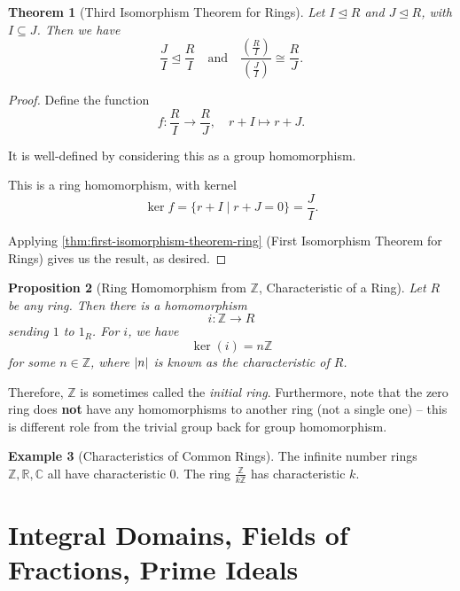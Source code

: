 \documentclass{article}
\newtheorem{theorem}{Theorem}[section]
\newtheorem{proposition}[theorem]{Proposition}
\theoremstyle{definition}
\newtheorem{example}[theorem]{Example}
\theoremstyle{remark}
\DeclarePairedDelimiter{\abs}{\lvert}{\rvert}
\newcommand{\pqty}[1]{\left(#1\right)}
\newcommand{\set}[2]{\{#1\mid #2\}}
\newcommand{\flatfrac}[2]{\frac{#1}{#2}}
\newcommand{\functiondomain}[3]{#1:#2\to #3}
\newcommand{\function}[5]{#1:#2\to #3,\quad #4\mapsto #5}
\newcommand{\qand}{\quad\text{and}\quad}
\newcommand{\isomorphic}{\cong}
\newcommand{\idealsub}{\trianglelefteq}
\newcommand{\ZZ}{\mathbb{Z}}
\newcommand{\RR}{\mathbb{R}}
\newcommand{\CC}{\mathbb{C}}
\begin{document}
\begin{theorem}[Third Isomorphism Theorem for Rings]
    \label{thm:third-isomorphism-theorem-ring}%
    Let \(I \idealsub R\) and \(J \idealsub R\), with \(I \subseteq J\). Then we have
    \[
        \flatfrac{J}{I} \idealsub \flatfrac{R}{I} \qand \flatfrac{\pqty{\flatfrac{R}{I}}}{\pqty{\flatfrac{J}{I}}} \isomorphic \flatfrac{R}{J}.
    \]
\end{theorem}

\begin{proof}
    Define the function
    \[
        \function{f}{\flatfrac{R}{I}}{\flatfrac{R}{J}}{r + I}{r + J.}
    \]

    It is well-defined by considering this as a group homomorphism.

    This is a ring homomorphism, with kernel
    \[
        \ker f = \set{r + I}{r + J = 0} = \flatfrac{J}{I}.
    \]

    Applying \autoref{thm:first-isomorphism-theorem-ring} (First Isomorphism Theorem for Rings) gives us the result, as desired.
\end{proof}

\begin{proposition}[Ring Homomorphism from \(\ZZ\), Characteristic of a Ring]
    \label{prop:ring-homomorphism-z-characteristic-of-ring}%
    Let \(R\) be any ring. Then there is a homomorphism
    \[
        \functiondomain{i}{\ZZ}{R}
    \]
    sending \(1\) to \(1_R\). For \(i\), we have
    \[
        \ker\pqty{i} = n \ZZ
    \]
    for some \(n \in \ZZ\), where \(\abs{n}\) is known as the \emph{characteristic} of \(R\).
\end{proposition}

Therefore, \(\ZZ\) is sometimes called the \emph{initial ring}. Furthermore, note that the zero ring does \textbf{not} have any homomorphisms to another ring (not a single one) -- this is different role from the trivial group back for group homomorphism.

\begin{example}[Characteristics of Common Rings]
    The infinite number rings \(\ZZ, \RR, \CC\) all have characteristic \(0\). The ring \(\flatfrac{\ZZ}{k\ZZ}\) has characteristic \(k\).
\end{example}

\section{Integral Domains, Fields of Fractions, Prime Ideals}
\end{document}
